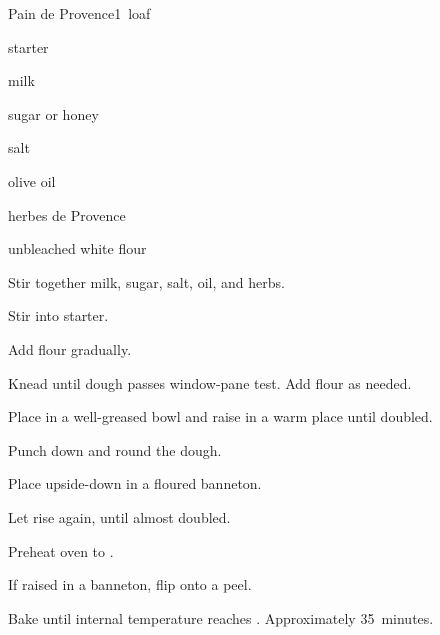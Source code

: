 \begin{recipe}{Pain de Provence}{}{1~loaf}

\begin{ingredients}
\item {} starter
\item \C{\half} milk
\item {} sugar or honey
\item {} salt
\item {} olive oil
\item {} herbes de Provence
\item {} unbleached white flour
\end{ingredients}

\begin{directions}
\item Stir together milk, sugar, salt, oil, and herbs.
\item Stir into starter.
\item Add flour gradually.
\item Knead until dough passes window-pane test. Add flour as needed.
\item Place in a well-greased bowl and raise in a warm place until doubled.
\item Punch down and round the dough.
\item Place upside-down in a floured banneton.
\item Let rise again, until almost doubled.
\item Preheat oven to .
\item If raised in a banneton, flip onto a peel.
\item Bake until internal temperature reaches . Approximately 35~minutes.
\end{directions}

\end{recipe}
